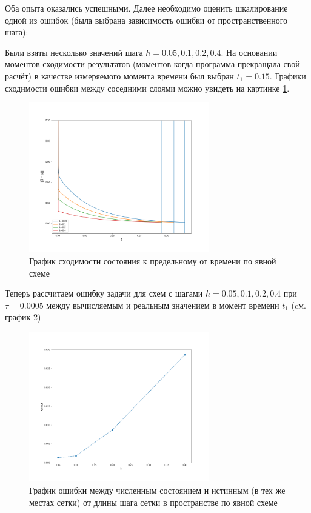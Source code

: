 Оба опыта оказались успешными. Далее необходимо оценить шкалирование одной из ошибок (была выбрана зависимость ошибки от пространственного шага):

Были взяты несколько значений шага $h = 0.05, 0.1, 0.2, 0.4$. На основании моментов сходимости результатов (моментов когда программа прекращала свой расчёт) в качестве измеряемого момента времени был выбран $t_1 = 0.15$. Графики сходимости ошибки между соседними слоями можно увидеть на картинке \ref{fig:expl_t1}.

\begin{figure}
\centering
\includegraphics[width=0.7\textwidth]{expl_t1.png}
\caption{График сходимости состояния к предельному от времени по явной схеме}
\label{fig:expl_t1}
\end{figure} 

Теперь рассчитаем ошибку задачи для схем с шагами $h = 0.05, 0.1, 0.2, 0.4$ при $\tau=0.0005$ между вычисляемым и реальным значением в момент времени $t_1$ (cм. график \ref{fig:expl_err})

\begin{figure}
\centering
\includegraphics[width=0.7\textwidth]{expl_err.png}
\caption{График ошибки между численным состоянием и истинным (в тех же местах сетки) от длины шага сетки в пространстве по явной схеме}
\label{fig:expl_err}
\end{figure} 

